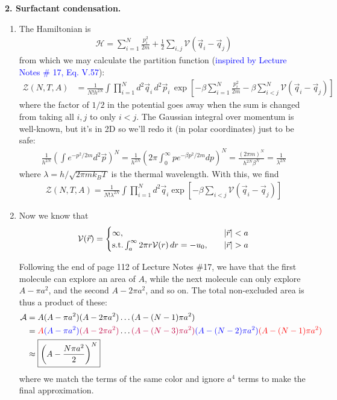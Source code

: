 \documentclass{article}
\theoremstyle{definition}
\newcommand{\ham}{\mathcal{H}}
\newcommand{\be}{\beta}
\newcommand{\f}[2]{\frac{#1}{#2}}
\newcommand{\lp}{\left(}
\newcommand{\rp}{\right)}
\newcommand{\lb}{\left[}
\newcommand{\rb}{\right]}
\begin{document}
\noindent \textbf{2. Surfactant condensation.}

\begin{enumerate}[label=(\alph*)]
	\item The Hamiltonian is 
	\begin{align*}
	\ham = \sum^N_{i=1} \f{p_i^2}{2m} + \f{1}{2}\sum_{i,j} \mathcal{V}(\vec{q}_i - \vec{q}_j)
	\end{align*}
	from which we may calculate the partition function (\textcolor{blue}{inspired by Lecture Notes \# 17, Eq. V.57}):
	\begin{align*}
	\mathcal{Z}(N,T,A) 
	&= \f{1}{N! h^{2N}}\int \prod^N_{i=1}  d^2 \vec{q}_i\, d^2 \vec{p}_i\, \exp\lb -\be \sum^N_{i=1} \f{p_i^2}{2m} - \be \sum^N_{i<j} \mathcal{V}(\vec{q}_i - \vec{q}_j) \rb
	\end{align*}
	where the factor of $1/2$ in the potential goes away when the sum is changed from taking all $i,j$ to only $i<j$. The Gaussian integral over momentum is well-known, but it's in 2D so we'll redo it (in polar coordinates) just to be safe:
	\begin{align*}
	\f{1}{h^{2N}} \lp \int e^{-p^2/2m } d^2\vec{p}  \rp^N = \f{1}{h^{2N}} \lp 2\pi \int_0^\infty p e^{-\be p^2/2m } dp  \rp^N = \f{(2\pi m)^N}{h^{2N} \be^N} = \f{1}{\lambda^{2N}}
	\end{align*}
	where $\lambda = h/\sqrt{2\pi m k_B T}$ is the thermal wavelength. With this, we find
	\begin{align*}
	\boxed{\mathcal{Z}(N,T,A) = \f{1}{N! \lambda^{2N}} \int \prod^N_{i=1} d^2 \vec{q}_i \exp\lb -\be \sum_{i<j} \mathcal{V}(\vec{q}_i - \vec{q}_j)  \rb}  
	\end{align*}
	
	\item Now we know that
	\begin{align*}
	\mathcal{V}(\vec{r}) = 
	\begin{cases}
	\infty, &\quad \abs{\vec{r}} < a \\
	\text{s.t.} \int_a^\infty 2\pi r \mathcal{V}(r) \,dr = -u_0 , &\quad  \abs{\vec{r}} > a
	\end{cases}
	\end{align*}
	
	Following the end of page 112 of Lecture Notes \#17, we have that the first molecule can explore an area of $A$, while the next molecule can only explore $A - \pi a^2$, and the second $A - 2\pi a^2$, and so on. The total non-excluded area is thus a product of these:
	\begin{align*}
	\mathcal{A} 
	&= A(A-\pi a^2)(A-2\pi a^2) \dots (A - (N-1)\pi a^2) \\
	&=  \textcolor{red}{A} \textcolor{blue}{(A-\pi a^2)}\textcolor{purple}{(A-2\pi a^2)} \dots \textcolor{purple}{(A - (N-3)\pi a^2)} \textcolor{blue}{(A - (N-2)\pi a^2)}\textcolor{red}{(A - (N-1)\pi a^2)}\\ 
	&\approx \boxed{\lp A - \f{N \pi a^2}{2}\rp^N}
	\end{align*}
	where we match the terms of the same color and ignore $a^4$ terms to make the final approximation. 
	

\end{enumerate}
\end{document}
